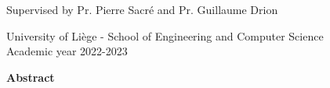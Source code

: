 \thispagestyle{plain}
\begin{center}
    \LARGE
    \textbf{\mytitle}
        
    \vspace{0.4cm}
    \Large
    \mysubtitle
        
    \vspace{0.4cm}
    \large
    \textbf{\myname}
    
    \vspace{0.1cm}
    Supervised by Pr. Pierre Sacré and Pr. Guillaume Drion 
    
    \vspace{0.4cm}
    \normalsize
    University of Liège - School of Engineering and Computer Science\\
    Academic year 2022-2023
       
    \vspace{0.6cm}
    \Large
    \textbf{Abstract}
\end{center}





